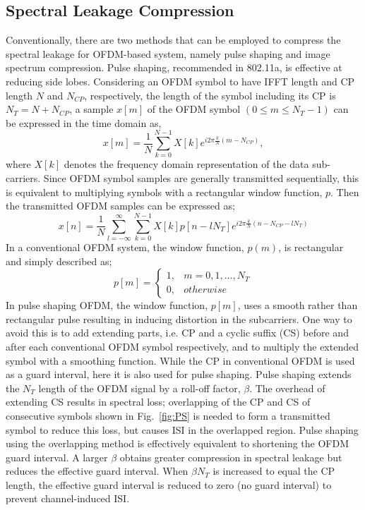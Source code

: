 \subsection{Spectral Leakage Compression}
Conventionally, there are two methods that can be employed to compress the spectral leakage for OFDM-based system, namely pulse shaping and image spectrum compression. Pulse shaping, recommended in 802.11a, is effective at reducing side lobes. 
Considering an OFDM symbol to have IFFT length and CP length $N$ and $N_{CP}$, respectively, the length of the symbol including its CP is $N_{T} = N + N_{CP}$,
a sample $x[m]$ of the OFDM symbol $(0\leq m \leq N_{T}-1)$ can be expressed in the time domain as,
\begin{equation}
\label{xm}
x[m] = \frac{1}{N}\sum_{k=0}^{N-1} X[k] e^{i2\pi\frac{k}{N}(m-N_{CP})},
\end{equation}
where $X[k]$ denotes the frequency domain representation of the data sub-carriers.
Since OFDM symbol samples are generally transmitted sequentially, this is equivalent to multiplying symbols with a rectangular window function, $p$.
Then the transmitted OFDM samples can be expressed as;
\begin{equation}
\label{equ:xn2}
x[n] = \frac{1}{N}\sum_{l=-\infty}^{\infty} \sum_{k=0}^{N-1} X[k] p[n-l N_{T}] e^{i2\pi\frac{k}{N}(n-N_{CP}-l N_{T})}
\end{equation}
In a conventional OFDM system, the window function, $p(m)$, is rectangular and simply described as;
\begin{equation}
\label{equ:pm}
 p[m] =\begin{cases}1, & m = 0,1, ..., N_{T} \\  0, & otherwise \end{cases}
\end{equation}
In pulse shaping OFDM, the window function, $p[m]$, uses a smooth rather than rectangular pulse resulting in inducing distortion in the subcarriers.
One way to avoid this is to add extending parts, i.e. CP and a cyclic suffix (CS) before and after each conventional OFDM symbol respectively, and to multiply the extended symbol with a smoothing function.
While the CP in conventional OFDM is used as a guard interval, here it is also used for pulse shaping. Pulse shaping extends the  $N_{T}$ length of the OFDM signal by a roll-off factor, $\beta$.
The overhead of extending CS results in spectral loss; overlapping of the CP and CS of consecutive symbols shown in Fig.~\ref{fig:PS} is needed to form a transmitted symbol to reduce this loss, but causes ISI in the overlapped region. Pulse shaping using the overlapping method is effectively equivalent to shortening the OFDM guard interval.
A larger $\beta$ obtains greater compression in spectral leakage but reduces the effective guard interval.
When $\beta N_{T}$ is increased to equal the CP length, the effective guard interval is reduced to zero (no guard interval) to prevent channel-induced ISI.

